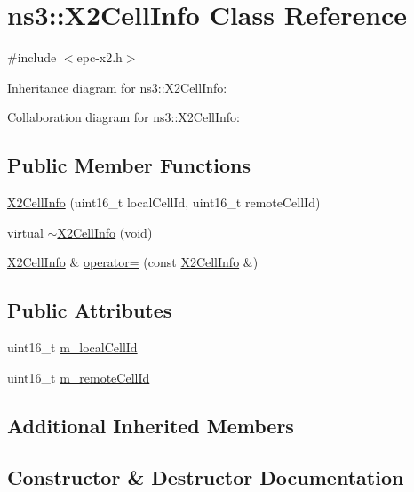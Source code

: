 \hypertarget{classns3_1_1X2CellInfo}{}\section{ns3\+:\+:X2\+Cell\+Info Class Reference}
\label{classns3_1_1X2CellInfo}


{\ttfamily \#include $<$epc-\/x2.\+h$>$}



Inheritance diagram for ns3\+:\+:X2\+Cell\+Info\+:


Collaboration diagram for ns3\+:\+:X2\+Cell\+Info\+:
\subsection*{Public Member Functions}
\begin{DoxyCompactItemize}
\item 
\hyperlink{classns3_1_1X2CellInfo_a4c97ef94027747f10f2e7221d6fad53e}{X2\+Cell\+Info} (uint16\+\_\+t local\+Cell\+Id, uint16\+\_\+t remote\+Cell\+Id)
\item 
virtual \hyperlink{classns3_1_1X2CellInfo_a3d3f993b589fcb144b2820f35ee85e7b}{$\sim$\+X2\+Cell\+Info} (void)
\item 
\hyperlink{classns3_1_1X2CellInfo}{X2\+Cell\+Info} \& \hyperlink{classns3_1_1X2CellInfo_acc9e0f3eaee9623de938f5407711b496}{operator=} (const \hyperlink{classns3_1_1X2CellInfo}{X2\+Cell\+Info} \&)
\end{DoxyCompactItemize}
\subsection*{Public Attributes}
\begin{DoxyCompactItemize}
\item 
uint16\+\_\+t \hyperlink{classns3_1_1X2CellInfo_ad7cf486215417b0286265cab71403093}{m\+\_\+local\+Cell\+Id}
\item 
uint16\+\_\+t \hyperlink{classns3_1_1X2CellInfo_a95a5a74099a012efbf82853147a46805}{m\+\_\+remote\+Cell\+Id}
\end{DoxyCompactItemize}
\subsection*{Additional Inherited Members}


\subsection{Constructor \& Destructor Documentation}
